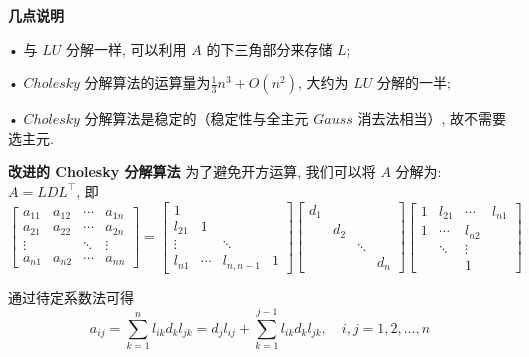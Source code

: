 \documentclass[12pt,a4paper]{article}
\begin{document}
{\bfseries 几点说明}

• 与 $LU$ 分解一样, 可以利用 $A$ 的下三角部分来存储 $L$;

• $Cholesky$ 分解算法的运算量为$\frac{1}{3} n^{3}+O\left(n^{2}\right)$, 大约为 $LU$ 分解的一半;

• $Cholesky$ 分解算法是稳定的（稳定性与全主元 $Gauss$ 消去法相当）,
故不需要选主元.

{\bfseries 改进的 Cholesky 分解算法}
为了避免开方运算, 我们可以将 $A$ 分解为: $A = LDL^{\top}$, 即
\begin{equation}
\left[\begin{array}{cccc}{a_{11}} & {a_{12}} & {\cdots} & {a_{1 n}} \\ {a_{21}} & {a_{22}} & {\cdots} & {a_{2 n}} \\ {\vdots} & {} & {\ddots} & {\vdots} \\ {a_{n 1}} & {a_{n 2}} & {\cdots} & {a_{n n}}\end{array}\right]=\left[\begin{array}{cccc}{1} & {} & {} & {} \\ {l_{21}} & {1} & {} & {} \\ {\vdots} & {} & {\ddots} & {} \\ {l_{n 1}} & {\cdots} & {l_{n, n-1}} & {1}\end{array}\right]\left[\begin{array}{cccc}{d_{1}} & {} & {} & {} \\ {} & {d_{2}} & {} & {} \\ {} & {} & {\ddots} & {} \\ {} & {} & {} & {d_{n}}\end{array}\right]\left[\begin{array}{cccc}{1} & {l_{21}} & {\cdots} & {l_{n 1}} \\ {1} & {\cdots} & {l_{n 2}} \\ {} & {\ddots} & {\vdots} \\ {} & {} & {1}\end{array}\right]
\end{equation}

通过待定系数法可得
\begin{equation}
a_{i j}=\sum_{k=1}^{n} l_{i k} d_{k} l_{j k}=d_{j} l_{i j}+\sum_{k=1}^{j-1} l_{i k} d_{k} l_{j k}, \quad i, j=1,2, \ldots, n
\end{equation}
\end{document}
